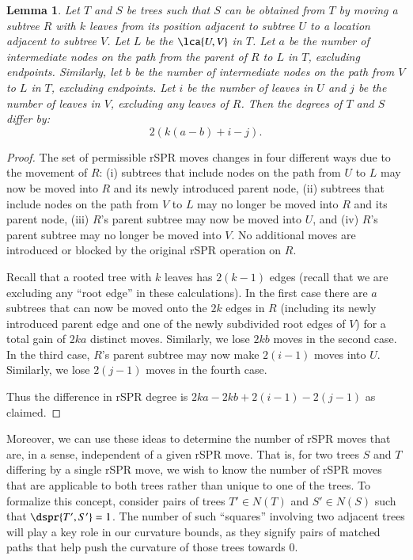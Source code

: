 \documentclass[]{elsarticle}
\newtheorem{lem}[thm]{Lemma}
\begin{document}
\begin{lem}
\label{lem:degree_change}
Let $T$ and $S$ be trees such that $S$ can be obtained from $T$ by moving a subtree $R$ with $k$ leaves from its position adjacent to subtree $U$ to a location adjacent to subtree $V$.
Let $L$ be the $\lca{U,V}$ in $T$.
Let $a$ be the number of intermediate nodes on the path from the parent of $R$ to $L$ in $T$, excluding endpoints.
Similarly, let $b$ be the number of intermediate nodes on the path from $V$ to $L$ in $T$, excluding endpoints.
Let $i$ be the number of leaves in $U$ and $j$ be the number of leaves in $V$, excluding any leaves of $R$.
Then the degrees of $T$ and $S$ differ by:
$$2\left(k(a-b) + i - j\right).$$

\end{lem}
\begin{proof}
The set of permissible rSPR moves changes in four different ways due to the movement of $R$:
(i) subtrees that include nodes on the path from $U$ to $L$ may now be moved into $R$ and its newly introduced parent node,
(ii) subtrees that include nodes on the path from $V$ to $L$ may no longer be moved into $R$ and its parent node,
(iii) $R$'s parent subtree may now be moved into $U$, and
(iv) $R$'s parent subtree may no longer be moved into $V$.
No additional moves are introduced or blocked by the original rSPR operation on $R$.

Recall that a rooted tree with $k$ leaves has $2(k-1)$ edges (recall that we are excluding any ``root edge'' in these calculations).
In the first case there are $a$ subtrees that can now be moved onto the $2k$ edges in $R$ (including its newly introduced parent edge and one of the newly subdivided root edges of $V$) for a total gain of $2ka$ distinct moves.
Similarly, we lose $2kb$ moves in the second case.
In the third case, $R$'s parent subtree may now make $2(i-1)$ moves into $U$.
Similarly, we lose $2(j-1)$ moves in the fourth case.

Thus the difference in rSPR degree is $2ka - 2kb + 2(i-1) - 2(j-1)$ as claimed.
\end{proof}


Moreover, we can use these ideas to determine the number of rSPR moves that are, in a sense, independent of a given rSPR move.
That is, for two trees $S$ and $T$ differing by a single rSPR move, we wish to know the number of rSPR moves that are applicable to both trees rather than unique to one of the trees.
To formalize this concept, consider pairs of trees $T' \in N(T)$ and $S' \in N(S)$ such that $\dspr{T',S'} = 1$.
The number of such ``squares'' involving two adjacent trees will play a key role in our curvature bounds, as they signify pairs of matched paths that help push the curvature of those trees towards 0.
\end{document}
